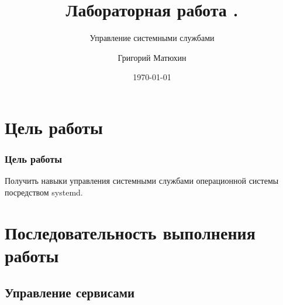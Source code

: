 \documentclass{beamer}
\author{Григорий Матюхин}
\date{\today}
\title{Лабораторная работа \textnumero5.}
\subtitle{Управление системными службами}
\begin{document}
\begin{frame}[plain]
	\titlepage
\end{frame}
\section{Цель работы}
\begin{frame}[plain]
	\frametitle{Цель работы}
	Получить навыки управления системными службами операционной системы посредством systemd.
\end{frame}

\section{Последовательность выполнения работы}
\subsection{Управление сервисами}
\end{document}
